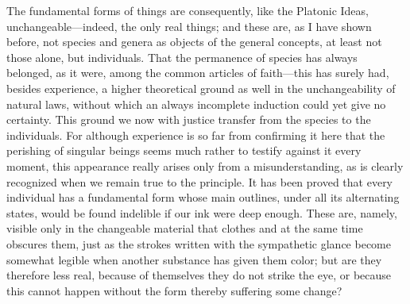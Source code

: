\documentclass[12pt,a4paper]{article}
\begin{document}
The fundamental forms of things are consequently, like the Platonic Ideas,
unchangeable---indeed, the only real things; and these
are, as I have shown before, not species and genera as objects of the general
concepts, at least not those alone, but individuals. That the permanence of
species has always belonged, as it were, among the common articles of faith---this
has surely had, besides experience, a higher theoretical ground as well in the
unchangeability of natural laws, without which an always incomplete induction
could yet give no certainty. This ground we now with justice transfer from the
species to the individuals. For although experience is so far from confirming it
here that the perishing of singular beings seems much rather to testify against it
every moment, this appearance really arises only from a misunderstanding, as is
clearly recognized when we remain true to the principle. It has been proved that
every individual has a fundamental form whose main outlines, under all its
alternating states, would be found indelible if our ink were deep enough. These
are, namely, visible only in the changeable material that clothes and at the same
time obscures them, just as the strokes written with the sympathetic glance
become somewhat legible when another substance has given them color; but are they
therefore less real, because of themselves they do not strike the eye, or because
this cannot happen without the form thereby suffering some change?
\end{document}
